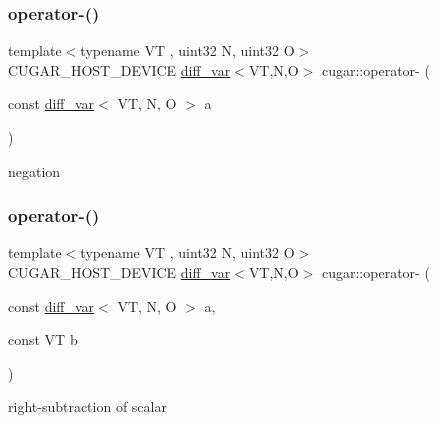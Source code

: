 \subsubsection{\texorpdfstring{operator-\/()}{operator-()}\hspace{0.1cm}{\footnotesize\ttfamily [1/4]}}
{\footnotesize\ttfamily template$<$typename VT , uint32 N, uint32 O$>$ \\
C\+U\+G\+A\+R\+\_\+\+H\+O\+S\+T\+\_\+\+D\+E\+V\+I\+CE \hyperlink{structcugar_1_1diff__var}{diff\+\_\+var}$<$VT,N,O$>$ cugar\+::operator-\/ (\begin{DoxyParamCaption}\item[{const \hyperlink{structcugar_1_1diff__var}{diff\+\_\+var}$<$ VT, N, O $>$}]{a }\end{DoxyParamCaption})\hspace{0.3cm}{\ttfamily [inline]}}

negation \mbox{\label{group___auto_diff_module_ga6052727ad3520694d4a37db71532423c}} 
\subsubsection{\texorpdfstring{operator-\/()}{operator-()}\hspace{0.1cm}{\footnotesize\ttfamily [2/4]}}
{\footnotesize\ttfamily template$<$typename VT , uint32 N, uint32 O$>$ \\
C\+U\+G\+A\+R\+\_\+\+H\+O\+S\+T\+\_\+\+D\+E\+V\+I\+CE \hyperlink{structcugar_1_1diff__var}{diff\+\_\+var}$<$VT,N,O$>$ cugar\+::operator-\/ (\begin{DoxyParamCaption}\item[{const \hyperlink{structcugar_1_1diff__var}{diff\+\_\+var}$<$ VT, N, O $>$}]{a,  }\item[{const VT}]{b }\end{DoxyParamCaption})\hspace{0.3cm}{\ttfamily [inline]}}

right-\/subtraction of scalar \mbox{\label{group___auto_diff_module_ga57d83c9449b450f1a1b3d655bb92ef24}} 
